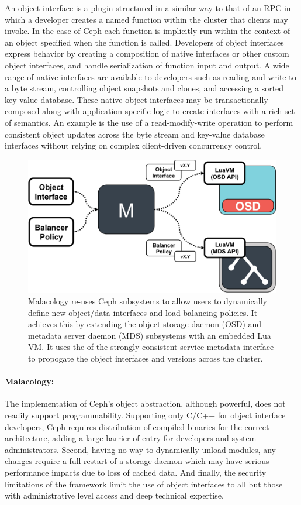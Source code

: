 \documentclass[preprint]{sigplanconf-eurosys}
\begin{document}
An object interface is a plugin structured in a similar way to that of an RPC
in which a developer creates a named function within the cluster that clients
may invoke. In the case of Ceph each function is implicitly run within the
context of an object specified when the function is called. Developers of
object interfaces express behavior by creating a composition of native
interfaces or other custom object interfaces, and handle serialization of
function input and output.
A wide range of native interfaces are available to developers such as reading
and write to a byte stream, controlling object snapshots and clones,
and accessing a sorted key-value database. These native object interfaces
may be transactionally composed along with application specific logic to
create interfaces with a rich set of semantics.
An example is the use of a read-modify-write operation to perform consistent
object updates across the byte stream and key-value database interfaces
without relying on complex client-driven concurrency control.

\begin{figure}[htbp]
\centering
\includegraphics{figures/implementation.png}
\caption{Malacology re-uses Ceph subsystems to allow users to dynamically
define new object/data interfaces and load balancing policies. It achieves this
by extending the object storage daemon (OSD) and metadata server daemon (MDS)
subsystems with an embedded Lua VM.  It uses the of the strongly-consistent
service metadata interface to propogate the object interfaces and versions
across the cluster.
\label{fig:implementation}} \end{figure}

\paragraph*{Malacology:} The implementation of Ceph's object abstraction,
although powerful, does not readily support programmability. Supporting only
C/C++ for object interface developers, Ceph requires distribution of compiled
binaries for the correct architecture, adding a large barrier of entry for
developers and system administrators. Second, having no way to dynamically
unload modules, any changes require a full restart of a storage daemon which
may have serious performance impacts due to loss of cached data. And finally,
the security limitations of the framework limit the use of object interfaces to
all but those with administrative level access and deep technical expertise.
\end{document}
